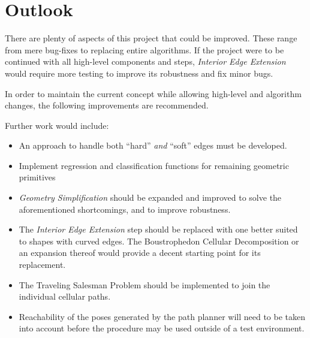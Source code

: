 \section{Outlook}
There are plenty of aspects of this project that could be improved.
These range from mere bug-fixes to replacing entire algorithms.
If the project were to be continued with all high-level components and steps, \textit{Interior Edge Extension} would require more testing to improve its robustness and fix minor bugs.

In order to maintain the current concept while allowing high-level and algorithm changes, the following improvements are recommended.

Further work would include:
\begin{itemize}
	\item An approach to handle both ``hard'' \textit{and} ``soft'' edges must be developed.
	\item Implement regression and classification functions for remaining geometric primitives
	\item \textit{Geometry Simplification} should be expanded and improved to solve the aforementioned shortcomings, and to improve robustness.
	\item The \textit{Interior Edge Extension} step should be replaced with one better suited to shapes with curved edges.
		The Boustrophedon Cellular Decomposition or an expansion thereof would provide a decent starting point for its replacement.
	\item The Traveling Salesman Problem should be implemented to join the individual cellular paths.
	\item Reachability of the poses generated by the path planner will need to be taken into account before the procedure may be used outside of a test environment.
\end{itemize}

